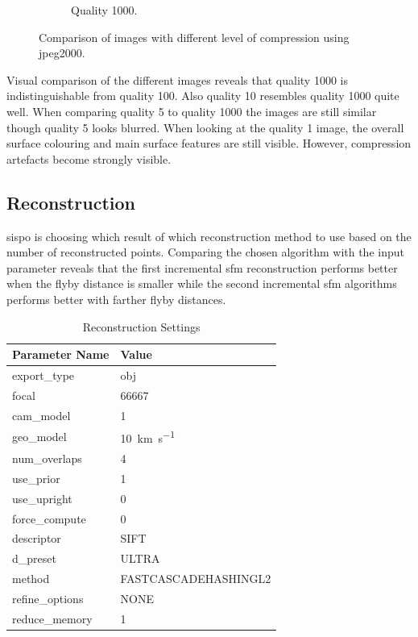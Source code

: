 \begin{figure}[htb]
\begin{subfigure}[b]{0.47\textwidth}
            \caption{Quality 1000.}
            \label{fig:img_quality_1000}
        \end{subfigure}
    \caption{Comparison of images with different level of compression using \gls{jpeg}2000.}
    \label{fig:img_quality_comp}
\end{figure}

Visual comparison of the different images reveals that quality 1000 is indistinguishable from quality 100. Also quality 10 resembles quality 1000 quite well. When comparing quality 5 to quality 1000 the images are still similar though quality 5 looks blurred. When looking at the quality 1 image, the overall surface colouring and main surface features are still visible. However, compression artefacts become strongly visible.

\subsection{Reconstruction}
\gls{sispo} is choosing which result of which reconstruction method to use based on the number of reconstructed points. Comparing the chosen algorithm with the input parameter reveals that the first incremental \gls{sfm} reconstruction performs better when the flyby distance is smaller while the second incremental \gls{sfm} algorithms performs better with farther flyby distances.

\begin{table}[htb]
    \centering
    \caption{Reconstruction Settings}
    \label{tab:comp_settings}
    \begin{tabular}{l|l}
        \textbf{Parameter Name} & \textbf{Value} \\ \hline
        export\_type       & obj   \\
        focal & 66667 \\
        cam\_model & \SI{1}{}     \\
        geo\_model & \SI{10}{\kilo\meter\per\second} \\
        num\_overlaps  & \SI{4}{} \\
        use\_prior & \SI{1}{} \\
        use\_upright & \SI{0}{} \\
        force\_compute & \SI{0}{} \\
        descriptor & SIFT \\
        d\_preset & ULTRA \\
        method & FASTCASCADEHASHINGL2 \\
        refine\_options & NONE \\
        reduce\_memory & 1
    \end{tabular}
\end{table}

